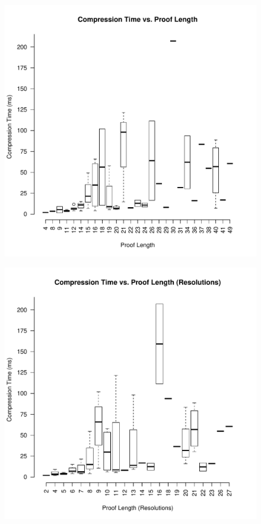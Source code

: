 \begin{figure}
\includegraphics[scale=0.5]{images/compress_time_vs_proof_length.pdf}
\end{figure}

\begin{figure}
\includegraphics[scale=0.5]{images/compress_time_vs_proof_length_res.pdf}
\end{figure}

